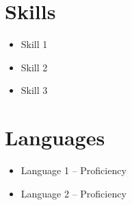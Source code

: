\documentclass[a4paper,11pt]{article}
\begin{document}
\begin{minipage}[t]{0.65\textwidth}
    \section*{Skills}
    \begin{itemize}
        \item Skill 1
        \item Skill 2
        \item Skill 3
    \end{itemize}

    \section*{Languages}
    \begin{itemize}
        \item Language 1 -- Proficiency
        \item Language 2 -- Proficiency
    \end{itemize}
\end{minipage}
\end{document}
